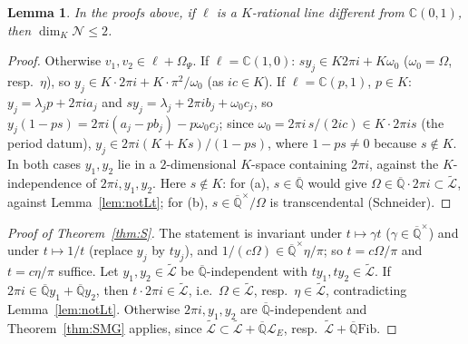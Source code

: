 \documentclass[11pt]{amsart}
\newtheorem{lemma}[theorem]{Lemma}
\theoremstyle{definition}
\newcommand{\Qb}{\overline{\mathbb{Q}}}
\newcommand{\C}{\mathbb{C}}
\newcommand{\Lg}{\mathcal{L}}
\newcommand{\Lt}{\widetilde{\mathcal{L}}}
\newcommand{\Fib}{\mathrm{Fib}}
\begin{document}
\begin{lemma}\label{lem:N2}
In the proofs above, if $\ell$ is a $K$-rational line different from $\C(0,1)$, then $\dim_K\mathcal N\le2$.
\end{lemma}

\begin{proof}
Otherwise $v_1,v_2\in\ell+\Omega_\Psi$. If $\ell=\C(1,0)$: $sy_j\in K2\pi i+K\omega_0$ ($\omega_0=\Omega$, resp.\ $\eta$), so
$y_j\in K\cdot2\pi i+K\cdot\pi^2/\omega_0$ (as $ic\in K$). If $\ell=\C(p,1)$, $p\in K$: $y_j=\lambda_jp+2\pi ia_j$ and
$sy_j=\lambda_j+2\pi ib_j+\omega_0c_j$, so $y_j(1-ps)=2\pi i(a_j-pb_j)-p\omega_0c_j$; since $\omega_0=2\pi i\,s/(2ic)\in K\cdot2\pi is$ (the
period datum), $y_j\in2\pi i(K+Ks)/(1-ps)$, where $1-ps\ne0$ because $s\notin K$. In both cases $y_1,y_2$ lie in a
$2$-dimensional $K$-space containing $2\pi i$, against the $K$-independence of $2\pi i,y_1,y_2$. Here $s\notin K$: for (a),
$s\in\Qb$ would give $\Omega\in\Qb\cdot2\pi i\subset\Lt$, against Lemma~\ref{lem:notLt}; for (b), $s\in\Qb^\times/\Omega$ is
transcendental (Schneider).
\end{proof}

\begin{proof}[Proof of Theorem~\ref{thm:S}]
The statement is invariant under $t\mapsto\gamma t$ ($\gamma\in\Qb^\times$) and under $t\mapsto1/t$ (replace $y_j$ by
$ty_j$), and $1/(c\Omega)\in\Qb^\times\eta/\pi$; so $t=c\Omega/\pi$ and $t=c\eta/\pi$ suffice. Let $y_1,y_2\in\Lt$ be
$\Qb$-independent with $ty_1,ty_2\in\Lt$. If $2\pi i\in\Qb y_1+\Qb y_2$, then $t\cdot2\pi i\in\Lt$, i.e.\ $\Omega\in\Lt$,
resp.\ $\eta\in\Lt$, contradicting Lemma~\ref{lem:notLt}. Otherwise $2\pi i,y_1,y_2$ are $\Qb$-independent and
Theorem~\ref{thm:SMG} applies, since $\Lt\subset\Lt+\Qb\Lg_E$, resp.\ $\Lt+\Qb\Fib$.
\end{proof}
\end{document}
